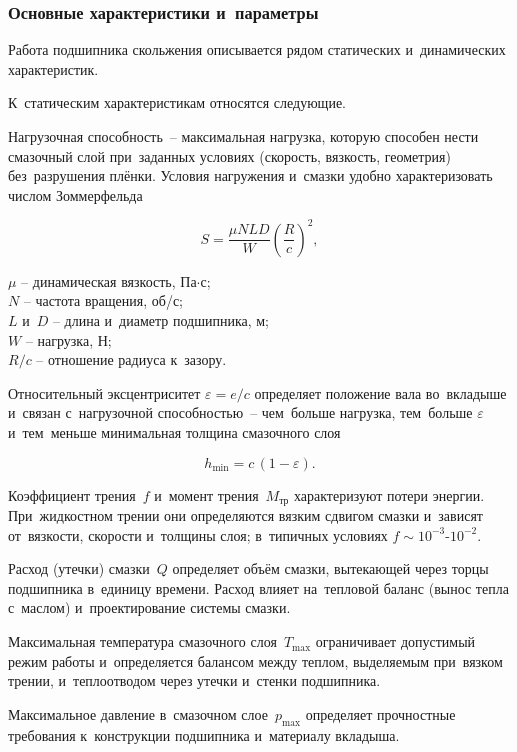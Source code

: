 \subsubsection{Основные характеристики и~параметры}

Работа подшипника скольжения описывается рядом статических и~динамических характеристик.

К~статическим характеристикам относятся следующие.

Нагрузочная способность~-- максимальная нагрузка, которую способен нести смазочный слой при~заданных условиях (скорость, вязкость, геометрия) без~разрушения плёнки. Условия нагружения и~смазки удобно характеризовать числом Зоммерфельда

\begin{equation}
S = \dfrac{\mu N L D}{W}\left(\dfrac{R}{c}\right)^2,
\end{equation}
\begin{conditions}
$\mu$ -- динамическая вязкость, Па$\cdot$с;\\
$N$ -- частота вращения, об/с;\\
$L$ и~$D$ -- длина и~диаметр подшипника, м;\\
$W$ -- нагрузка, Н;\\
$R/c$ -- отношение радиуса к~зазору.
\end{conditions}
Относительный эксцентриситет $\varepsilon = e/c$ определяет положение вала во~вкладыше и~связан с~нагрузочной способностью~-- чем~больше нагрузка, тем~больше $\varepsilon$ и~тем~меньше минимальная толщина смазочного слоя

\begin{equation}
h_{\min} = c\,(1-\varepsilon).
\end{equation}

Коэффициент трения~$f$ и~момент трения~$M_{\text{тр}}$ характеризуют потери энергии. При~жидкостном трении они определяются вязким сдвигом смазки и~зависят от~вязкости, скорости и~толщины слоя; в~типичных условиях $f \sim 10^{-3}\text{-}10^{-2}$.

Расход (утечки) смазки~$Q$ определяет объём смазки, вытекающей через торцы подшипника в~единицу времени. Расход влияет на~тепловой баланс (вынос тепла с~маслом) и~проектирование системы смазки.

Максимальная температура смазочного слоя~$T_{\max}$ ограничивает допустимый режим работы и~определяется балансом между теплом, выделяемым при~вязком трении, и~теплоотводом через утечки и~стенки подшипника.

Максимальное давление в~смазочном слое~$p_{\max}$ определяет прочностные требования к~конструкции подшипника и~материалу вкладыша.

